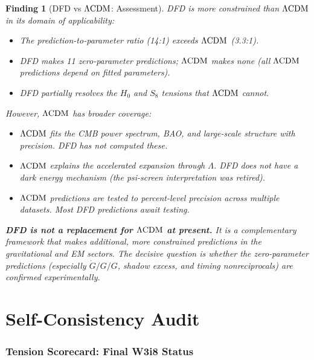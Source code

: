 \documentclass[11pt]{article}
\newtheorem{finding}{Finding}
\newcommand{\Gdot}{\dot{G}/G}
\newcommand{\LCDM}{\Lambda{\rm CDM}}
\begin{document}
\begin{finding}[DFD vs $\LCDM$: Assessment]
\label{find:comparison}
DFD is more constrained than $\LCDM$ in its domain of applicability:
\begin{itemize}[nosep]
\item The prediction-to-parameter ratio (14:1) exceeds $\LCDM$ (3.3:1).
\item DFD makes 11 zero-parameter predictions; $\LCDM$ makes none
  (all $\LCDM$ predictions depend on fitted parameters).
\item DFD partially resolves the $H_0$ and $S_8$ tensions that $\LCDM$
  cannot.
\end{itemize}

However, $\LCDM$ has broader coverage:
\begin{itemize}[nosep]
\item $\LCDM$ fits the CMB power spectrum, BAO, and large-scale
  structure with precision. DFD has not computed these.
\item $\LCDM$ explains the accelerated expansion through $\Lambda$.
  DFD does not have a dark energy mechanism (the psi-screen
  interpretation was retired).
\item $\LCDM$ predictions are tested to percent-level precision
  across multiple datasets. Most DFD predictions await testing.
\end{itemize}

\textbf{DFD is not a replacement for $\LCDM$ at present.} It is a
complementary framework that makes additional, more constrained
predictions in the gravitational and EM sectors. The decisive question
is whether the zero-parameter predictions (especially $\Gdot/G$,
shadow excess, and timing nonreciprocals) are confirmed experimentally.
\end{finding}


\newpage
\part{Self-Consistency Audit}
\label{part:audit}

\section{Tension Scorecard: Final W3i8 Status}
\label{sec:tensions}
\end{document}
